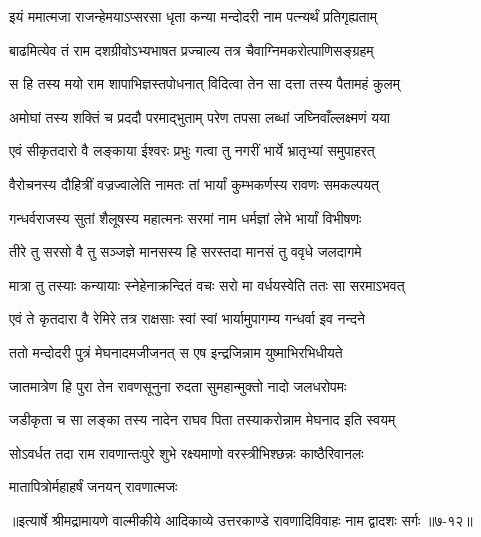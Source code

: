 \twolineshloka
{इयं ममात्मजा राजन्हेमयाऽप्सरसा धृता}
{कन्या मन्दोदरी नाम पत्न्यर्थं प्रतिगृह्यताम्} %

\twolineshloka
{बाढमित्येव तं राम दशग्रीवोऽभ्यभाषत}
{प्रज्चाल्य तत्र चैवाग्निमकरोत्पाणिसङ्ग्रहम्} %

\twolineshloka
{स हि तस्य मयो राम शापाभिज्ञस्तपोधनात्}
{विदित्वा तेन सा दत्ता तस्य पैतामहं कुलम्} %

\twolineshloka
{अमोघां तस्य शक्तिं च प्रददौ परमाद्भुताम्}
{परेण तपसा लब्धां जघ्निवाँल्लक्ष्मणं यया} %

\twolineshloka
{एवं सीकृतदारो वै लङ्काया ईश्वरः प्रभुः}
{गत्वा तु नगरीं भार्ये भ्रातृभ्यां समुपाहरत्} %

\twolineshloka
{वैरोचनस्य दौहित्रीं वज्रज्वालेति नामतः}
{तां भार्यां कुम्भकर्णस्य रावणः समकल्पयत्} %

\twolineshloka
{गन्धर्वराजस्य सुतां शैलूषस्य महात्मनः}
{सरमां नाम धर्मज्ञां लेभे भार्यां विभीषणः} %

\twolineshloka
{तीरे तु सरसो वै तु सञ्जज्ञे मानसस्य हि}
{सरस्तदा मानसं तु ववृधे जलदागमे} %

\twolineshloka
{मात्रा तु तस्याः कन्यायाः स्नेहेनाक्रन्दितं वचः}
{सरो मा वर्धयस्वेति ततः सा सरमाऽभवत्} %

\twolineshloka
{एवं ते कृतदारा वै रेमिरे तत्र राक्षसाः}
{स्वां स्वां भार्यामुपागम्य गन्धर्वा इव नन्दने} %

\twolineshloka
{ततो मन्दोदरी पुत्रं मेघनादमजीजनत्}
{स एष इन्द्रजिन्नाम युष्माभिरभिधीयते} %

\twolineshloka
{जातमात्रेण हि पुरा तेन रावणसूनुना}
{रुदता सुमहान्मुक्तो नादो जलधरोपमः} %

\twolineshloka
{जडीकृता च सा लङ्का तस्य नादेन राघव}
{पिता तस्याकरोन्नाम मेघनाद इति स्वयम्} %

\twolineshloka
{सोऽवर्धत तदा राम रावणान्तःपुरे शुभे}
{रक्ष्यमाणो वरस्त्रीभिश्छन्नः काष्ठैरिवानलः} %

\onelineshloka
{मातापित्रोर्महाहर्षं जनयन् रावणात्मजः} %


॥इत्यार्षे श्रीमद्रामायणे वाल्मीकीये आदिकाव्ये उत्तरकाण्डे रावणादिविवाहः नाम द्वादशः सर्गः ॥७-१२॥
